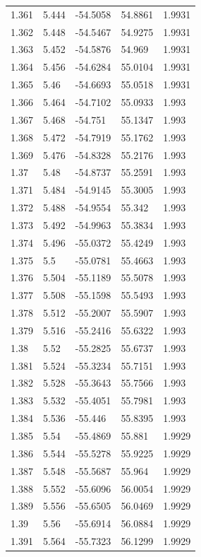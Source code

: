 \begin{tabular}{lllll}
1.361 & 5.444 & -54.5058 & 54.8861 & 1.9931 \\
1.362 & 5.448 & -54.5467 & 54.9275 & 1.9931 \\
1.363 & 5.452 & -54.5876 & 54.969 & 1.9931 \\
1.364 & 5.456 & -54.6284 & 55.0104 & 1.9931 \\
1.365 & 5.46 & -54.6693 & 55.0518 & 1.9931 \\
1.366 & 5.464 & -54.7102 & 55.0933 & 1.993 \\
1.367 & 5.468 & -54.751 & 55.1347 & 1.993 \\
1.368 & 5.472 & -54.7919 & 55.1762 & 1.993 \\
1.369 & 5.476 & -54.8328 & 55.2176 & 1.993 \\
1.37 & 5.48 & -54.8737 & 55.2591 & 1.993 \\
1.371 & 5.484 & -54.9145 & 55.3005 & 1.993 \\
1.372 & 5.488 & -54.9554 & 55.342 & 1.993 \\
1.373 & 5.492 & -54.9963 & 55.3834 & 1.993 \\
1.374 & 5.496 & -55.0372 & 55.4249 & 1.993 \\
1.375 & 5.5 & -55.0781 & 55.4663 & 1.993 \\
1.376 & 5.504 & -55.1189 & 55.5078 & 1.993 \\
1.377 & 5.508 & -55.1598 & 55.5493 & 1.993 \\
1.378 & 5.512 & -55.2007 & 55.5907 & 1.993 \\
1.379 & 5.516 & -55.2416 & 55.6322 & 1.993 \\
1.38 & 5.52 & -55.2825 & 55.6737 & 1.993 \\
1.381 & 5.524 & -55.3234 & 55.7151 & 1.993 \\
1.382 & 5.528 & -55.3643 & 55.7566 & 1.993 \\
1.383 & 5.532 & -55.4051 & 55.7981 & 1.993 \\
1.384 & 5.536 & -55.446 & 55.8395 & 1.993 \\
1.385 & 5.54 & -55.4869 & 55.881 & 1.9929 \\
1.386 & 5.544 & -55.5278 & 55.9225 & 1.9929 \\
1.387 & 5.548 & -55.5687 & 55.964 & 1.9929 \\
1.388 & 5.552 & -55.6096 & 56.0054 & 1.9929 \\
1.389 & 5.556 & -55.6505 & 56.0469 & 1.9929 \\
1.39 & 5.56 & -55.6914 & 56.0884 & 1.9929 \\
1.391 & 5.564 & -55.7323 & 56.1299 & 1.9929 \\

\end{tabular}
